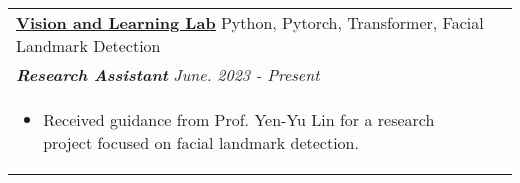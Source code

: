 \documentclass[a4paper,8pt]{article}
\begin{document}
\begin{tabularx}{\linewidth}{ @{}l r@{} }
\color[HTML]{0000cd} \textbf{\uline{\href{https://github.com/Official-Meichu-Hackathon}{Vision and Learning Lab}}} \hfill \color[HTML]{371e77} Python, Pytorch, Transformer, Facial Landmark Detection \\
\color[HTML]{371e77}\textbf{\textit{Research Assistant}} \hfill \color[HTML]{4B28A4} \textit{June. 2023 - Present} \\
\begin{minipage}[t]{\linewidth}
    \begin{itemize}[nosep,after=\strut, leftmargin=2em, itemsep=2pt]
        \item Received guidance from Prof. Yen-Yu Lin for a research project focused on facial landmark detection. %
    \end{itemize}
    \end{minipage}
\end{tabularx}
\end{document}
